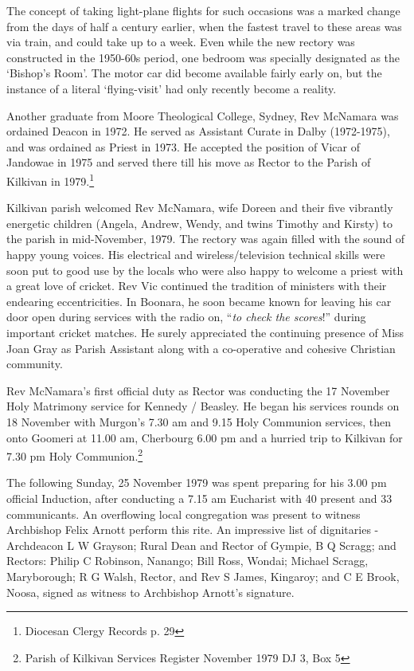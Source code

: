 The concept of taking light-plane flights for such occasions was a marked change from the days of half a century earlier, when the fastest travel to these areas was via train, and could take up to a week. Even while the new rectory was constructed in the 1950-60s period, one bedroom was specially designated as the `Bishop's Room'. The motor car did become available fairly early on, but the instance of a literal `flying-visit' had only recently become a reality.



Another graduate from Moore Theological College, Sydney, Rev McNamara was ordained Deacon in 1972. He served as Assistant Curate in Dalby (1972-1975), and was ordained as Priest in 1973. He accepted the position of Vicar of Jandowae in 1975 and served there till his move as Rector to the Parish of Kilkivan in 1979.\footnote{Diocesan Clergy Records p. 29}


Kilkivan parish welcomed Rev McNamara, wife Doreen and their five vibrantly energetic children (Angela, Andrew, Wendy, and twins Timothy and Kirsty) to the parish in mid-November, 1979. The rectory was again filled with the sound of happy young voices. His electrical and wireless/television technical skills were soon put to good use by the locals who were also happy to welcome a priest with a great love of cricket. Rev Vic continued the tradition of ministers with their endearing eccentricities. In Boonara, he soon became known for leaving his car door open during services with the radio on, ``\emph{to check the scores}!'' during important cricket matches. He surely appreciated the continuing presence of Miss Joan Gray as Parish Assistant along with a co-operative and cohesive Christian community.



Rev McNamara's first official duty as Rector was conducting the 17 November Holy Matrimony service for Kennedy / Beasley. He began his services rounds on 18 November with Murgon's 7.30 am and 9.15 Holy Communion services, then onto Goomeri at 11.00 am, Cherbourg 6.00 pm and a hurried trip to Kilkivan for 7.30 pm Holy Communion.\footnote{Parish of Kilkivan Services Register November 1979 DJ 3, Box 5}


The following Sunday, 25 November 1979 was spent preparing for his 3.00 pm official Induction, after conducting a 7.15 am Eucharist with 40 present and 33 communicants. An overflowing local congregation was present to witness Archbishop Felix Arnott perform this rite. An impressive list of dignitaries - Archdeacon L W Grayson; Rural Dean and Rector of Gympie, B Q Scragg; and Rectors: Philip C Robinson, Nanango; Bill Ross, Wondai; Michael Scragg, Maryborough; R G Walsh, Rector, and Rev S James, Kingaroy; and C E Brook, Noosa, signed as witness to Archbishop Arnott's signature.



